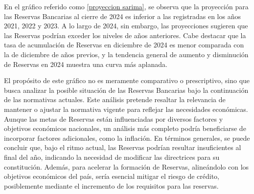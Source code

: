 En el gráfico referido como \ref{proyeccion sarima}, se observa que la proyección para las Reservas Bancarias al cierre de 2024 es inferior a las registradas en los años 2021, 2022 y 2023. A lo largo de 2024, sin embargo, las proyecciones sugieren que las Reservas podrían exceder los niveles de años anteriores. Cabe destacar que la tasa de acumulación de Reservas en diciembre de 2024 es menor comparada con la de diciembre de años previos, y la tendencia general de aumento y disminución de Reservas en 2024 muestra una curva más aplanada.

El propósito de este gráfico no es meramente comparativo o prescriptivo, sino que busca analizar la posible situación de las Reservas Bancarias bajo la continuación de las normativas actuales. Este análisis pretende resaltar la relevancia de mantener o ajustar la normativa vigente para reflejar las necesidades económicas. Aunque las metas de Reservas están influenciadas por diversos factores y objetivos económicos nacionales, un análisis más completo podría beneficiarse de incorporar factores adicionales, como la inflación. En términos generales, se puede concluir que, bajo el ritmo actual, las Reservas podrían resultar insuficientes al final del año, indicando la necesidad de modificar las directrices para su constitución. Además, para acelerar la formación de Reservas, alineándolo con los objetivos económicos del país, sería esencial mitigar el riesgo de crédito, posiblemente mediante el incremento de los requisitos para las reservas.
